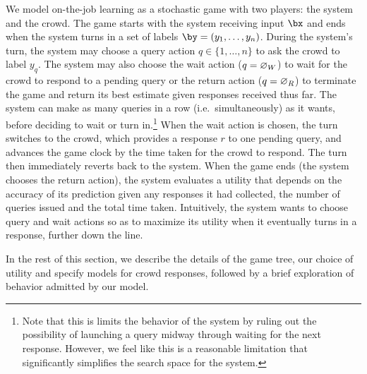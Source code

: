 

We model on-the-job learning as a stochastic game with two players: the system and the crowd.
The game starts with the system receiving input $\bx$ and ends when the system turns in a set of labels $\by = (y_1, \ldots, y_n)$. 
During the system's turn, the system may choose a query action $q \in \{1, \ldots, n\}$ to ask the crowd to label $y_q$. 
The system may also choose 
the wait action ($q = \varnothing_{W}$) to wait for the crowd to respond to a pending query
or
the return action ($q = \varnothing_{R}$) to terminate the game and return its best estimate given responses received thus far.
The system can make as many queries in a row (i.e.\ simultaneously) as it wants, before deciding to wait or turn in.\footnote{
Note that this is limits the behavior of the system by ruling out the possibility of launching a query midway through waiting for the next response. However, we feel like this is a reasonable limitation that significantly simplifies the search space for the system.
}
When the wait action is chosen, the turn switches to the crowd, which provides a response $r$ to one pending query, and advances the game clock by the time taken for the crowd to respond.
The turn then immediately reverts back to the system.
When the game ends (the system chooses the return action), the system evaluates a utility that depends on the accuracy of its prediction given any responses it had collected, the number of queries issued and the total time taken.
Intuitively, the system wants to choose query and wait actions so as to maximize its utility when it eventually turns in a response, further down the line.

In the rest of this section, we describe the details of the game tree, our choice of utility and specify models for crowd responses, followed by a brief exploration of behavior admitted by our model.

